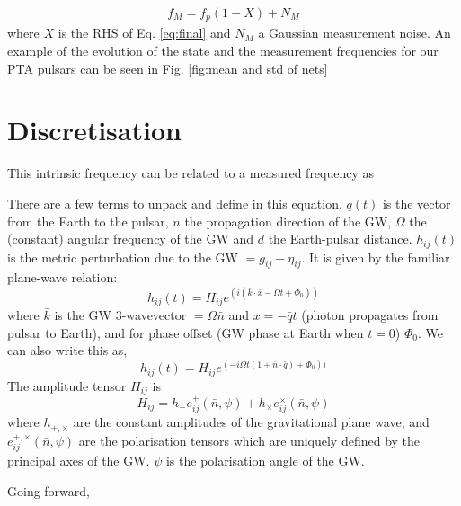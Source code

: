 \documentclass[fleqn,usenatbib,useAMS]{mnras}
\begin{document}
\begin{eqnarray}
	f_M = f_p(1 - X) + N_M
\end{eqnarray}
where $X$ is the RHS of Eq. \ref{eq:final} and $N_M$ a Gaussian measurement noise. An example of the evolution of the state and the measurement frequencies for our PTA pulsars can be seen in Fig. \ref{fig:mean and std of nets}









\section{Discretisation}

This intrinsic frequency can be related to a measured frequency as 


There are a few terms to unpack and define in this equation. $q(t)$ is the vector from the Earth to the pulsar, $n$ the propagation direction of the GW, $\Omega$ the (constant) angular frequency of the GW and $d$ the Earth-pulsar distance. $h_{ij}(t)$ is the metric perturbation due to the GW $= g_{ij} - \eta_{ij}$. It is given by the familiar plane-wave relation:	
\begin{equation}
	h_{ij}(t) = H_{ij} e^{(i(\bar{k} \cdot \bar{x} - \Omega t + \Phi_0))}
\end{equation}
where $\bar{k}$ is the GW 3-wavevector $=\Omega \bar{n}$ and $x = -\bar{q} t$ (photon propagates from pulsar to Earth), and for phase offset (GW phase at Earth when $t=0$) $\Phi_0$.  We can also write this as,
\begin{equation}
h_{ij}(t) = H_{ij} e^{(-i\Omega t (1 + \bar{n} \cdot \bar{q} ) + \Phi_0))}
\end{equation}
The amplitude tensor  $H_{ij}$ is
\begin{equation}
	H_{ij} = h_+ e_{ij}^+(\bar{n},\psi) + h_{\times} e_{ij}^{\times}(\bar{n},\psi)
\end{equation}
where $h_{+,\times}$ are the constant amplitudes of the gravitational plane wave, and $e_{ij}^{+, \times}(\bar{n}, \psi)$ are the polarisation tensors which are uniquely defined by the principal axes of the GW. $\psi$ is the polarisation angle of the GW. \newline 








\noindent Going forward,  \newline 
\end{document}
